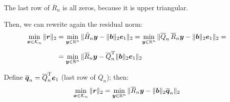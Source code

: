 \documentclass[
  12pt,
  paper=a4,
]{scrartcl} %
\begin{document}
The last row of $\overline R_n$ is all zeros, because it is upper triangular.

Then, we can rewrite again the residual norm:
\begin{align*}
    \displaystyle\min_{\bm x\in\Kry_n}\normtwo{
        \bm r
    }
    &=
    \min_{\bm y\in\RR^{n}}\normtwo{
        \tilde H_{n} \bm y - \normtwo{\bm b}\bm e_1
    }
    =
    \min_{\bm y\in\RR^{n}}\normtwo{
        \overline Q_n \, \overline R_n \bm y - \normtwo{\bm b}\bm e_1
    }=%
\\[0.5em]
    &=
    \min_{\bm y\in\RR^{n}}\normtwo{
        \overline R_n \bm y - \overline Q_n\transp \normtwo{\bm b}\bm e_1
    }
\end{align*}

Define $\overline{\bm q}_n=\overline Q_n^{\mathrm{T}}\bm e_1$ (last row of $\overline Q_n$); then:
\[
    \displaystyle\min_{\bm x\in\mathcal{K}_n}\|
        \bm r
    \|_2
    =
    \min_{\bm y\in\mathbb R^{n}}\|
        \overline R_n \bm y - \|\bm b\|_2 \overline{\bm q}_n
    \|_2
\]
\end{document}
